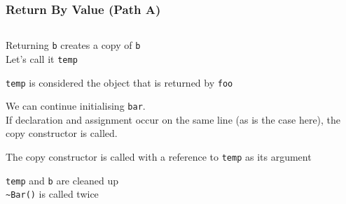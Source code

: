 \begin{frame}
  \frametitle{Return By Value (Path A)}
  \begin{center}
    \begin{columns}
      \column{4cm}
      \column{4cm}
    \end{columns}
  \end{center}
  \vskip2mm
  \begin{overprint}
    \begin{center}
      Returning {\tt b} creates a copy of {\tt b} \\
      Let's call it {\tt temp} \\
    \end{center}

    \begin{center}
      {\tt temp} is considered the object that is returned by {\tt foo}
    \end{center}

    \begin{center}
      We can continue initialising {\tt bar}. \\
      If declaration and assignment occur on the same line (as is the case here),
      the copy constructor is called.
    \end{center}

    \begin{center}
      The copy constructor is called with a reference to {\tt temp} as its argument
    \end{center}

    \begin{center}
      {\tt temp} and {\tt b} are cleaned up \\
      {\tt \~{}Bar()} is called twice
    \end{center}
  \end{overprint}
\end{frame}

